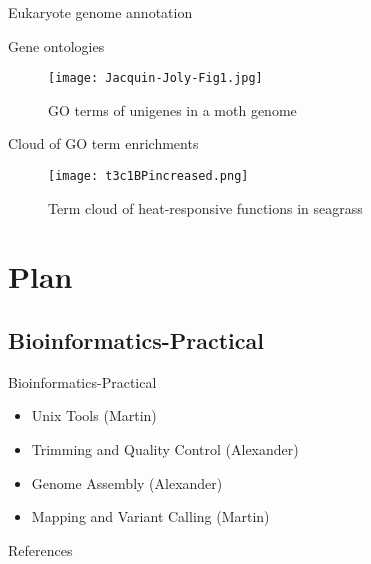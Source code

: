 \documentclass[presentation]{beamer}
\begin{document}
\begin{frame}[label=sec-4-1-6]{Eukaryote genome annotation}
\begin{center}
\begin{figure}[htb]
\begin{tikzpicture}
\end{tikzpicture}
\end{figure}
\end{center}
\end{frame}
\begin{frame}[label=sec-4-1-7]{Gene ontologies}
\begin{center}

\begin{figure}[htb]
\centering
\texttt{[image: Jacquin-Joly-Fig1.jpg]}
\caption{GO terms of unigenes in a moth genome}
\end{figure}

\tiny{\citep{Jacquin2012}}
\end{center}
\end{frame}



\begin{frame}[label=sec-4-1-8]{Cloud of GO term enrichments}
\begin{figure}[htb]
\centering
\texttt{[image: t3c1BPincreased.png]}
\caption{Term cloud of heat-responsive functions in seagrass}
\end{figure}
\end{frame}

\section{Plan}
\label{sec-5}
\subsection{Bioinformatics-Practical}
\label{sec-5-1}
\begin{frame}[label=sec-5-1-1]{Bioinformatics-Practical}
\begin{itemize}
\item Unix Tools (Martin)
\item Trimming and Quality Control (Alexander)
\item Genome Assembly (Alexander)
\item Mapping and Variant Calling (Martin)
\end{itemize}
\end{frame}
\begin{frame}[label=sec-5-1-2]{References}
\raggedright
\printbibliography[sorting=nty,heading=bibnumbered]
\end{frame}
\end{document}
